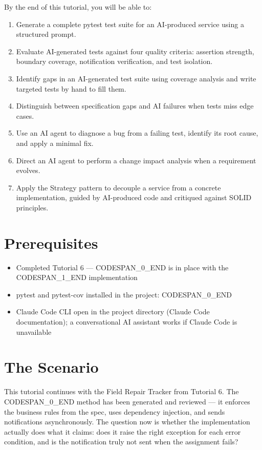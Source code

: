 \documentclass[11pt,a4paper]{book}
\begin{document}
By the end of this tutorial, you will be able to:

\begin{enumerate}
  \item Generate a complete pytest test suite for an AI-produced service using a structured prompt.
  \item Evaluate AI-generated tests against four quality criteria: assertion strength, boundary coverage, notification verification, and test isolation.
  \item Identify gaps in an AI-generated test suite using coverage analysis and write targeted tests by hand to fill them.
  \item Distinguish between specification gaps and AI failures when tests miss edge cases.
  \item Use an AI agent to diagnose a bug from a failing test, identify its root cause, and apply a minimal fix.
  \item Direct an AI agent to perform a change impact analysis when a requirement evolves.
  \item Apply the Strategy pattern to decouple a service from a concrete implementation, guided by AI-produced code and critiqued against SOLID principles.
\end{enumerate}

\medskip

\section{Prerequisites}

\begin{itemize}
  \item Completed Tutorial 6 --- CODESPAN\_0\_END is in place with the CODESPAN\_1\_END implementation
  \item pytest and pytest-cov installed in the project: CODESPAN\_0\_END
  \item Claude Code CLI open in the project directory (Claude Code documentation); a conversational AI assistant works if Claude Code is unavailable
\end{itemize}

\medskip

\section{The Scenario}

This tutorial continues with the Field Repair Tracker from Tutorial 6. The CODESPAN\_0\_END method has been generated and reviewed --- it enforces the business rules from the spec, uses dependency injection, and sends notifications asynchronously. The question now is whether the implementation actually does what it claims: does it raise the right exception for each error condition, and is the notification truly not sent when the assignment fails?
\end{document}
